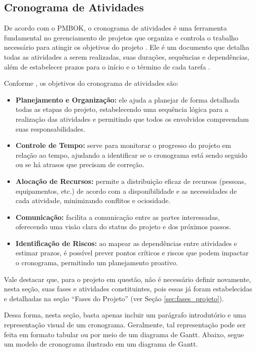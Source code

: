 \subsection{Cronograma de Atividades}\label{sec:cronograma}

De acordo com o PMBOK, o cronograma de atividades é uma ferramenta fundamental no gerenciamento de projetos que organiza e controla o trabalho necessário para atingir os objetivos do projeto \cite{Anunciacao2020,Ramos2020}. Ele é um documento que detalha todas as atividades a serem realizadas, suas durações, sequências e dependências, além de estabelecer prazos para o início e o término de cada tarefa \cite{PMBOK2021}.

Conforme , os objetivos do cronograma de atividades são:
\begin{itemize}[nosep, leftmargin=2.5cm]
    \item \textbf{Planejamento e Organização:} ele ajuda a planejar de forma detalhada todas as etapas do projeto, estabelecendo uma sequência lógica para a realização das atividades e permitindo que todos os envolvidos compreendam suas responsabilidades.
    \item \textbf{Controle de Tempo:} serve para monitorar o progresso do projeto em relação ao tempo, ajudando a identificar se o cronograma está sendo seguido ou se há atrasos que precisam de correção.
    \item \textbf{Alocação de Recursos:} permite a distribuição eficaz de recursos (pessoas, equipamentos, etc.) de acordo com a disponibilidade e as necessidades de cada atividade, minimizando conflitos e ociosidade.
    \item \textbf{Comunicação:} facilita a comunicação entre as partes interessadas, oferecendo uma visão clara do status do projeto e dos próximos passos.
    \item \textbf{Identificação de Riscos:} ao mapear as dependências entre atividades e estimar prazos, é possível prever pontos críticos e riscos que podem impactar o cronograma, permitindo um planejamento proativo.
\end{itemize}

Vale destacar que, para o projeto em questão, não é necessário definir novamente, nesta seção, suas fases e atividades constituintes, pois essas já foram estabelecidas e detalhadas na seção ``Fases do Projeto'' (ver Seção \ref{sec:fases_projeto}).

Dessa forma, nesta seção, basta apenas incluir um parágrafo introdutório e uma re\-presentação visual de um cronograma. Geralmente, tal representação pode ser feita em formato tabular ou por meio de um diagrama de Gantt. Abaixo, segue um modelo de cronograma ilustrado em um diagrama de Gantt.

